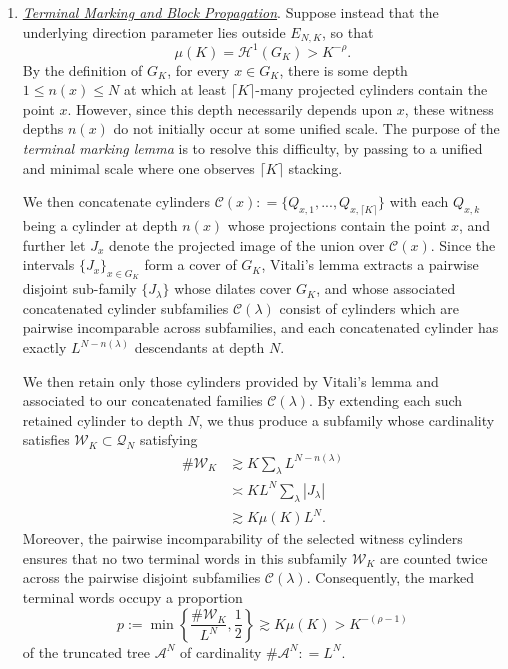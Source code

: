 \documentclass[12pt]{amsart}
\numberwithin{equation}{section}
\begin{document}
\begin{enumerate}[leftmargin=*,labelindent=0pt]
    \medskip

    \item \underline{\textit{Terminal Marking and Block Propagation}}.
    Suppose instead that the underlying direction parameter lies outside $E_{N,K}$, so
    that
    \[
        \mu(K)=\mathcal H^1(G_K)>K^{-\rho}.
    \]
    By the definition of $G_K$, for every $x\in G_K$, there is some depth $1 \leq n(x)\leq N$ at which at least $\lceil K\rceil$-many projected cylinders contain the point $x$.  However, since this depth necessarily
    depends upon $x$, these witness depths $n(x)$ do not initially occur at some unified scale.  The purpose of the \textit{terminal marking lemma} is to resolve this difficulty, by passing to a unified and minimal scale where one observes $\lceil K \rceil$ stacking.

    We then concatenate cylinders $\mathcal{C}(x) : = \{Q_{x,1},...,Q_{x,\lceil K \rceil}\}$ with each $Q_{x,k}$ being a cylinder at depth $n(x)$ whose projections contain the point $x$, and further let $J_x$ denote the projected image of the union over $\mathcal{C}(x)$. Since the intervals $\{J_x\}_{x \in G_K}$ form a cover of $G_K$, Vitali's lemma extracts a pairwise disjoint sub-family $\{J_{\lambda}\}$ whose dilates cover $G_K$, and whose associated concatenated cylinder subfamilies $\mathcal{C}(\lambda)$ consist of cylinders which are pairwise incomparable across subfamilies, and each concatenated cylinder has exactly $L^{N-n(\lambda)}$ descendants at depth $N$. 
    
    We then retain only those cylinders provided by Vitali's lemma and associated to our concatenated families $\mathcal{C}(\lambda)$. By extending each such retained cylinder to depth $N$, we thus produce a subfamily whose cardinality satisfies
    $\mathscr W_K\subset\mathscr Q_N$ satisfying
    \[
    \begin{aligned}
        \#\mathscr W_K
        &\gtrsim
        K\sum_\lambda L^{N-n(\lambda)}\\
        &\asymp
        KL^N\sum_\lambda |J_\lambda|\\
        &\gtrsim
        K\mu(K)L^N.
    \end{aligned}
    \]
    Moreover, the pairwise incomparability of the selected witness cylinders ensures that no two terminal words in this subfamily $\mathscr{W}_K$ are counted twice across the pairwise disjoint subfamilies $\mathcal{C}(\lambda)$. Consequently, the marked terminal words occupy a proportion
    \[
        p:=\min\left\{
        \frac{\#\mathscr W_K}{L^N},\frac12
        \right\}
        \gtrsim K\mu(K)
        >K^{-(\rho-1)}
    \]
    of the truncated tree $\mathcal{A}^N$ of cardinality $\# \mathcal{A}^N : = L^N$. 
    

\end{enumerate}
\end{document}
